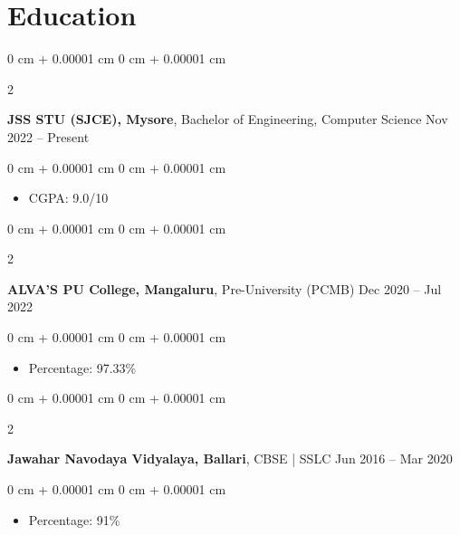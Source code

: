 \documentclass[10pt, letterpaper]{article}
\newenvironment{highlights}{
    \begin{itemize}[
        topsep=0.10 cm,
        parsep=0.10 cm,
        partopsep=0pt,
        itemsep=0pt,
        leftmargin=0 cm + 10pt
    ]
}{
    \end{itemize}
} %
\newenvironment{onecolentry}{
    \begin{adjustwidth}{
        0 cm + 0.00001 cm
    }{
        0 cm + 0.00001 cm
    }
}{
    \end{adjustwidth}
} %
\newenvironment{twocolentry}[2][]{
    \onecolentry
    \def\secondColumn{#2}
    \setcolumnwidth{\fill, 4.5 cm}
    \begin{paracol}{2}
}{
    \switchcolumn \raggedleft \secondColumn
    \end{paracol}
    \endonecolentry
} %
\begin{document}
    \section{Education}

        \begin{twocolentry}{
            Nov 2022 – Present
        }
            \textbf{JSS STU (SJCE), Mysore}, Bachelor of Engineering, Computer Science\end{twocolentry}

        \vspace{0.10 cm}
        \begin{onecolentry}
            \begin{highlights}
                \item CGPA: 9.0/10
            \end{highlights}
        \end{onecolentry}

        \vspace{0.2 cm}

        \begin{twocolentry}{
            Dec 2020 – Jul 2022
        }
            \textbf{ALVA'S PU College, Mangaluru}, Pre-University (PCMB)\end{twocolentry}

        \vspace{0.10 cm}
        \begin{onecolentry}
            \begin{highlights}
                \item Percentage: 97.33\%
            \end{highlights}
        \end{onecolentry}

        \vspace{0.2 cm}

        \begin{twocolentry}{
            Jun 2016 – Mar 2020
        }
            \textbf{Jawahar Navodaya Vidyalaya, Ballari}, CBSE | SSLC\end{twocolentry}

        \vspace{0.10 cm}
        \begin{onecolentry}
            \begin{highlights}
                \item Percentage: 91\%
            \end{highlights}
        \end{onecolentry}
\end{document}
